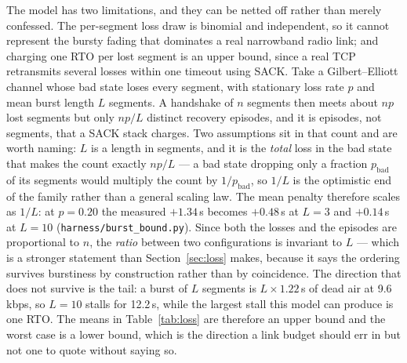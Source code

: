 \documentclass[drones,article,submit,pdftex,moreauthors]{Definitions/mdpi}
\newcommand{\kbps}{kbps}
\begin{document}
The model has two limitations, and they can be netted off rather than
merely confessed. The per-segment loss draw is binomial and independent,
so it cannot represent the bursty fading that dominates a real
narrowband radio link; and charging one RTO per lost segment is an upper
bound, since a real TCP retransmits several losses within one timeout
using SACK. Take a Gilbert--Elliott channel whose bad state loses every
segment, with stationary loss rate $p$ and mean burst length $L$
segments. A handshake of $n$ segments then meets about $n p$ lost
segments but only $n p / L$ distinct recovery episodes, and it is
episodes, not segments, that a SACK stack charges. Two assumptions sit
in that count and are worth naming: $L$ is a length in segments, and it
is the \emph{total} loss in the bad state that makes the count exactly
$np/L$ --- a bad state dropping only a fraction $p_{\mathrm{bad}}$ of
its segments would multiply the count by $1/p_{\mathrm{bad}}$, so $1/L$
is the optimistic end of the family rather than a general scaling law.
The mean penalty
therefore scales as $1/L$: at $p = 0.20$ the measured $+1.34$\,s becomes
$+0.48$\,s at $L=3$ and $+0.14$\,s at $L=10$
(\texttt{harness/burst\_bound.py}). Since both the losses and the
episodes are proportional to $n$, the \emph{ratio} between two
configurations is invariant to $L$ --- which is a stronger statement than
Section~\ref{sec:loss} makes, because it says the ordering survives
burstiness by construction rather than by coincidence. The direction
that does not survive is the tail: a burst of $L$ segments is
$L \times 1.22$\,s of dead air at 9.6\,\kbps{}, so $L=10$ stalls for
12.2\,s, while the largest stall this model can produce is one RTO. The
means in Table~\ref{tab:loss} are therefore an upper bound and the
worst case is a lower bound, which is the direction a link budget
should err in but not one to quote without saying so.
\end{document}
